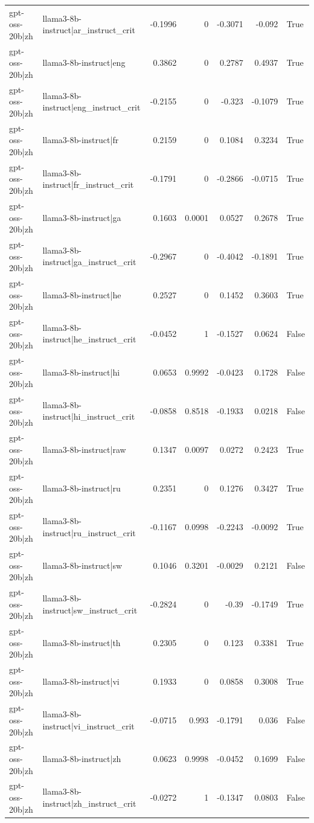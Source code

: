 \begin{table}
\begin{tabular}{l l r r r r l}
gpt-oss-20b|zh & llama3-8b-instruct|ar_instruct_crit & -0.1996 & 0 & -0.3071 & -0.092 & True \\
gpt-oss-20b|zh & llama3-8b-instruct|eng & 0.3862 & 0 & 0.2787 & 0.4937 & True \\
gpt-oss-20b|zh & llama3-8b-instruct|eng_instruct_crit & -0.2155 & 0 & -0.323 & -0.1079 & True \\
gpt-oss-20b|zh & llama3-8b-instruct|fr & 0.2159 & 0 & 0.1084 & 0.3234 & True \\
gpt-oss-20b|zh & llama3-8b-instruct|fr_instruct_crit & -0.1791 & 0 & -0.2866 & -0.0715 & True \\
gpt-oss-20b|zh & llama3-8b-instruct|ga & 0.1603 & 0.0001 & 0.0527 & 0.2678 & True \\
gpt-oss-20b|zh & llama3-8b-instruct|ga_instruct_crit & -0.2967 & 0 & -0.4042 & -0.1891 & True \\
gpt-oss-20b|zh & llama3-8b-instruct|he & 0.2527 & 0 & 0.1452 & 0.3603 & True \\
gpt-oss-20b|zh & llama3-8b-instruct|he_instruct_crit & -0.0452 & 1 & -0.1527 & 0.0624 & False \\
gpt-oss-20b|zh & llama3-8b-instruct|hi & 0.0653 & 0.9992 & -0.0423 & 0.1728 & False \\
gpt-oss-20b|zh & llama3-8b-instruct|hi_instruct_crit & -0.0858 & 0.8518 & -0.1933 & 0.0218 & False \\
gpt-oss-20b|zh & llama3-8b-instruct|raw & 0.1347 & 0.0097 & 0.0272 & 0.2423 & True \\
gpt-oss-20b|zh & llama3-8b-instruct|ru & 0.2351 & 0 & 0.1276 & 0.3427 & True \\
gpt-oss-20b|zh & llama3-8b-instruct|ru_instruct_crit & -0.1167 & 0.0998 & -0.2243 & -0.0092 & True \\
gpt-oss-20b|zh & llama3-8b-instruct|sw & 0.1046 & 0.3201 & -0.0029 & 0.2121 & False \\
gpt-oss-20b|zh & llama3-8b-instruct|sw_instruct_crit & -0.2824 & 0 & -0.39 & -0.1749 & True \\
gpt-oss-20b|zh & llama3-8b-instruct|th & 0.2305 & 0 & 0.123 & 0.3381 & True \\
gpt-oss-20b|zh & llama3-8b-instruct|vi & 0.1933 & 0 & 0.0858 & 0.3008 & True \\
gpt-oss-20b|zh & llama3-8b-instruct|vi_instruct_crit & -0.0715 & 0.993 & -0.1791 & 0.036 & False \\
gpt-oss-20b|zh & llama3-8b-instruct|zh & 0.0623 & 0.9998 & -0.0452 & 0.1699 & False \\
gpt-oss-20b|zh & llama3-8b-instruct|zh_instruct_crit & -0.0272 & 1 & -0.1347 & 0.0803 & False \\

\end{tabular}
\end{table}
